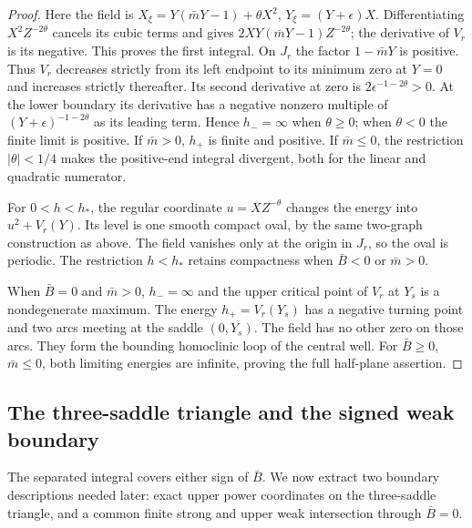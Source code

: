 \begin{proof}
Here the field is
$X_\xi=Y(\bar mY-1)+\theta X^2$,
$Y_\xi=(Y+\epsilon)X$.
Differentiating $X^2Z^{-2\theta}$ cancels its cubic terms and gives
$2X Y(\bar mY-1)Z^{-2\theta}$; the derivative of $V_r$
is its negative. This proves the first integral.
On $J_r$ the factor $1-\bar mY$ is positive. Thus $V_r$ decreases
strictly from its left endpoint to its minimum zero at $Y=0$ and
increases strictly thereafter. Its second derivative at zero is
$2\epsilon^{-1-2\theta}>0$.
At the lower boundary its derivative has a negative nonzero multiple
of $(Y+\epsilon)^{-1-2\theta}$ as its leading term. Hence
$h_- =\infty$ when $\theta\ge0$; when $\theta<0$ the finite
limit is positive. If $\bar m>0$, $h_+$ is finite and positive.
If $\bar m\le0$, the restriction $|\theta|<1/4$ makes the
positive-end integral divergent, both for the linear and quadratic
numerator.

For $0<h<h_*$, the regular coordinate $u=XZ^{-\theta}$ changes
the energy into $u^2+V_r(Y)$. Its level is one smooth compact oval,
by the same two-graph construction as above. The field vanishes only
at the origin in $J_r$, so the oval is periodic. The restriction
$h<h_*$ retains compactness when $\bar B<0$ or $\bar m>0$.

When $\bar B=0$ and $\bar m>0$, $h_- =\infty$ and the upper
critical point of $V_r$ at $Y_s$ is a nondegenerate maximum.
The energy $h_+=V_r(Y_s)$ has a negative turning point and two
arcs meeting at the saddle $(0,Y_s)$. The field has no other zero
on those arcs. They form the bounding homoclinic loop of the central
well. For $\bar B\ge0$, $\bar m\le0$, both limiting energies
are infinite, proving the full half-plane assertion.
\end{proof}

\subsection{The three-saddle triangle and the signed weak boundary}

The separated integral covers either sign of $\bar B$. We now extract
two boundary descriptions needed later: exact upper power coordinates
on the three-saddle triangle, and a common finite strong and upper weak
intersection through $\bar B=0$.

